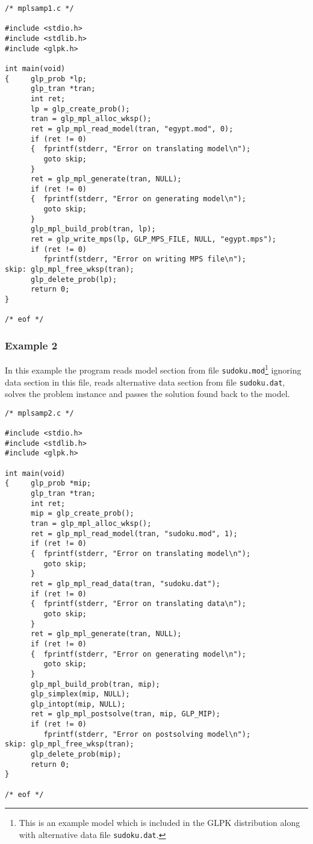 \begin{small}
\begin{verbatim}
/* mplsamp1.c */

#include <stdio.h>
#include <stdlib.h>
#include <glpk.h>

int main(void)
{     glp_prob *lp;
      glp_tran *tran;
      int ret;
      lp = glp_create_prob();
      tran = glp_mpl_alloc_wksp();
      ret = glp_mpl_read_model(tran, "egypt.mod", 0);
      if (ret != 0)
      {  fprintf(stderr, "Error on translating model\n");
         goto skip;
      }
      ret = glp_mpl_generate(tran, NULL);
      if (ret != 0)
      {  fprintf(stderr, "Error on generating model\n");
         goto skip;
      }
      glp_mpl_build_prob(tran, lp);
      ret = glp_write_mps(lp, GLP_MPS_FILE, NULL, "egypt.mps");
      if (ret != 0)
         fprintf(stderr, "Error on writing MPS file\n");
skip: glp_mpl_free_wksp(tran);
      glp_delete_prob(lp);
      return 0;
}

/* eof */
\end{verbatim}
\end{small}

\subsubsection*{Example 2}

In this example the program reads model section from file
\verb|sudoku.mod|\footnote{This is an example model which is included
in the GLPK distribution along with alternative data file
{\tt sudoku.dat}.} ignoring data section in this file, reads alternative
data section from file \verb|sudoku.dat|, solves the problem instance
and passes the solution found back to the model.

\begin{small}
\begin{verbatim}
/* mplsamp2.c */

#include <stdio.h>
#include <stdlib.h>
#include <glpk.h>

int main(void)
{     glp_prob *mip;
      glp_tran *tran;
      int ret;
      mip = glp_create_prob();
      tran = glp_mpl_alloc_wksp();
      ret = glp_mpl_read_model(tran, "sudoku.mod", 1);
      if (ret != 0)
      {  fprintf(stderr, "Error on translating model\n");
         goto skip;
      }
      ret = glp_mpl_read_data(tran, "sudoku.dat");
      if (ret != 0)
      {  fprintf(stderr, "Error on translating data\n");
         goto skip;
      }
      ret = glp_mpl_generate(tran, NULL);
      if (ret != 0)
      {  fprintf(stderr, "Error on generating model\n");
         goto skip;
      }
      glp_mpl_build_prob(tran, mip);
      glp_simplex(mip, NULL);
      glp_intopt(mip, NULL);
      ret = glp_mpl_postsolve(tran, mip, GLP_MIP);
      if (ret != 0)
         fprintf(stderr, "Error on postsolving model\n");
skip: glp_mpl_free_wksp(tran);
      glp_delete_prob(mip);
      return 0;
}

/* eof */
\end{verbatim}
\end{small}

